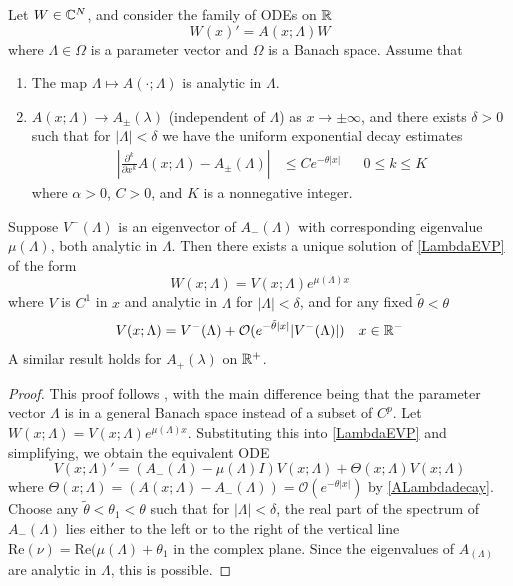 \documentclass[thesis.tex]{subfiles}
\begin{document}
\begin{lemma}\label{gaplemma}
Let $W \in \mathbb{C}^N$, and consider the family of ODEs on $\mathbb{R}$
\begin{equation}\label{LambdaEVP}
W(x)' = A(x; \Lambda) W
\end{equation}
where $\Lambda \in \Omega$ is a parameter vector and $\Omega$ is a Banach space. Assume that
\begin{enumerate}
	\item The map $\Lambda \mapsto A(\cdot; \Lambda)$ is analytic in $\Lambda$.
	\item $A(x; \Lambda) \rightarrow A_\pm(\lambda)$ (independent of $\Lambda$) as $x \rightarrow \pm \infty$, and there exists $\delta > 0$ such that for $|\Lambda| < \delta$ we have the uniform exponential decay estimates 
	\begin{align}\label{ALambdadecay}
	\left| \frac{\partial^k}{\partial x^k} A(x; \Lambda) - A_\pm(\Lambda) \right| 
	&\leq C e^{-\theta |x|} && 0 \leq k \leq K
	\end{align}
	where $\alpha > 0$, $C > 0$, and $K$ is a nonnegative integer.
\end{enumerate}
Suppose $V^-(\Lambda)$ is an eigenvector of $A_-(\Lambda)$ with corresponding eigenvalue $\mu(\Lambda)$, both analytic in $\Lambda$. Then there exists a unique solution of \ref{LambdaEVP} of the form 
\begin{equation}
W(x; \Lambda) = V(x; \Lambda) e^{\mu(\Lambda)x}
\end{equation}
where $V$ is $C^1$ in $x$ and analytic in $\Lambda$ for $|\Lambda| < \delta$, and for any fixed $\tilde{\theta} < \theta$
\begin{align}
V(x; \Lambda) = V^-(\Lambda) + \mathcal{O}(e^{-\tilde{\theta}|x|}|V^-(\Lambda)|) && x \in \mathbb{R}^-
\end{align}
A similar result holds for $A_+(\lambda)$ on $\mathbb{R}^+$.

\begin{proof}
This proof follows \cite{Zumbrun2009}, with the main difference being that the parameter vector $\Lambda$ is in a general Banach space instead of a subset of $C^p$. Let $W(x; \Lambda) = V(x; \Lambda) e^{\mu(\Lambda) x}$. Substituting this into \eqref{LambdaEVP} and simplifying, we obtain the equivalent ODE
\begin{equation}\label{VEVP}
V(x; \Lambda)' = (A_-(\Lambda) - \mu(\Lambda)I)V(x; \Lambda) + \Theta(x; \Lambda) V(x; \Lambda)
\end{equation}
where $\Theta(x; \Lambda) = (A(x; \Lambda) - A_-(\Lambda)) = \mathcal{O}(e^{-\theta|x|})$ by \eqref{ALambdadecay}. Choose any $\tilde{\theta} < \theta_1 < \theta$ such that for $|\Lambda| < \delta$, the real part of the spectrum of $A_-(\Lambda)$ lies either to the left or to the right of the vertical line $\text{Re}(\nu) = \text{Re}(\mu(\Lambda) + \theta_1$ in the complex plane. Since the eigenvalues of $A_(\Lambda)$ are analytic in $\Lambda$, this is possible.


\end{proof}
\end{lemma}
\end{document}

